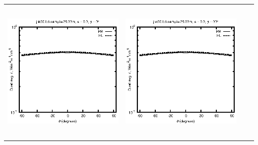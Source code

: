 \begin{tabular}{c c c c}
\includegraphics[height=7cm]{../eps/jok00_Ld_sample_25.00m_fwd.eps} &
\includegraphics[height=7cm]{../eps/jok00_Ld_sample_25.00m_cross.eps} \\
\end{tabular}

\pagebreak

